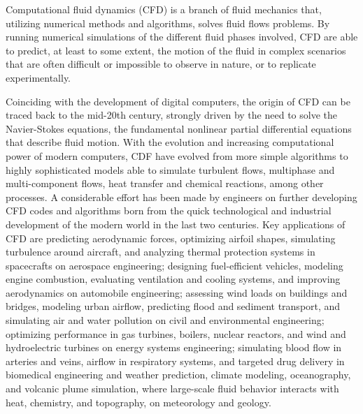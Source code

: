 Computational fluid dynamics (CFD) is a branch of fluid mechanics that, utilizing numerical methods and algorithms, solves fluid flows problems. By running numerical simulations of the different fluid phases involved, CFD are able to predict, at least to some extent, the motion of the fluid in complex scenarios that are often difficult or impossible to observe in nature, or to replicate experimentally. 

Coinciding with the development of digital computers, the origin of CFD can be traced back to the mid-20th century, strongly driven by the need to solve the Navier-Stokes equations, the fundamental nonlinear partial differential equations that describe fluid motion. With the evolution and increasing computational power of modern computers, CDF have evolved from more simple algorithms to highly sophisticated models able to simulate turbulent flows, multiphase and multi-component flows, heat transfer and chemical reactions, among other processes. A considerable effort has been made by engineers on further developing  CFD codes and algorithms born from the quick technological and industrial development of the modern world in the last two centuries. Key applications of CFD are predicting aerodynamic forces, optimizing airfoil shapes, simulating turbulence around aircraft, and analyzing thermal protection systems in spacecrafts on aerospace engineering; designing fuel-efficient vehicles, modeling engine combustion, evaluating ventilation and cooling systems, and improving aerodynamics on automobile engineering;  assessing wind loads on buildings and bridges, modeling urban airflow, predicting flood and sediment transport, and simulating air and water pollution on civil and environmental engineering;  optimizing performance in gas turbines, boilers, nuclear reactors, and wind and hydroelectric turbines on energy systems engineering; simulating blood flow in arteries and veins, airflow in respiratory systems, and targeted drug delivery in biomedical engineering and weather prediction, climate modeling, oceanography, and volcanic plume simulation, where large-scale fluid behavior interacts with heat, chemistry, and topography, on meteorology and geology.

